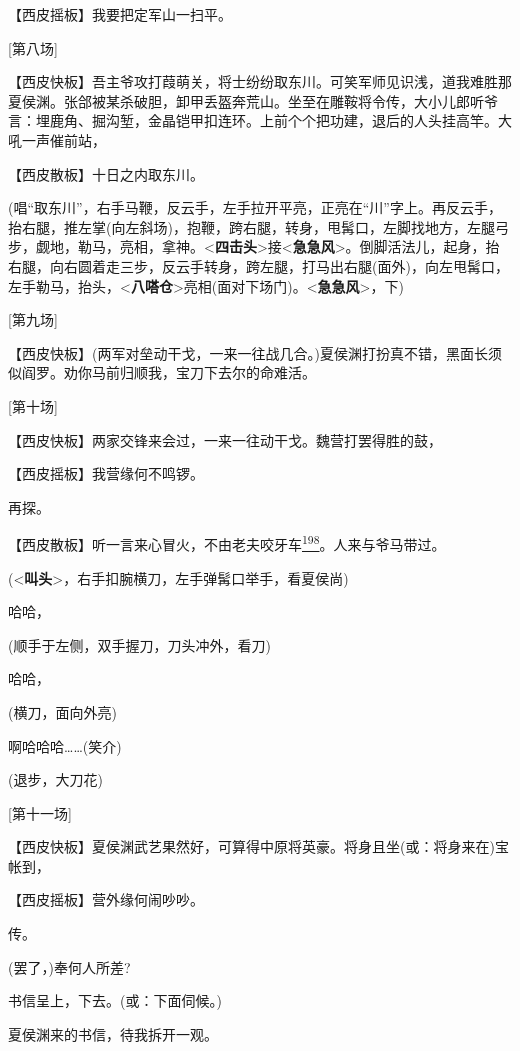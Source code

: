 【西皮摇板】我要把定军山一扫平。

{[}第八场{]}

【西皮快板】吾主爷攻打葭萌关，将士纷纷取东川。可笑军师见识浅，道我难胜那夏侯渊。张郃被某杀破胆，卸甲丢盔奔荒山。坐至在雕鞍将令传，大小儿郎听爷言：埋鹿角、掘沟堑，金晶铠甲扣连环。上前个个把功建，退后的人头挂高竿。大吼一声催前站，

【西皮散板】十日之内取东川。

(唱``取东川''，右手马鞭，反云手，左手拉开平亮，正亮在``川''字上。再反云手，抬右腿，推左掌(向左斜场)，抱鞭，跨右腿，转身，甩髯口，左脚找地方，左腿弓步，觑地，勒马，亮相，拿神。\textless{}\textbf{四击头}\textgreater{}接\textless{}\textbf{急急风}\textgreater{}。倒脚活法儿，起身，抬右腿，向右圆着走三步，反云手转身，跨左腿，打马出右腿(面外)，向左甩髯口，左手勒马，抬头，\textless{}\textbf{八嗒仓}\textgreater{}亮相(面对下场门)。\textless{}\textbf{急急风}\textgreater{}，下)

{[}第九场{]}

【西皮快板】(两军对垒动干戈，一来一往战几合。)夏侯渊打扮真不错，黑面长须似阎罗。劝你马前归顺我，宝刀下去尔的命难活。

{[}第十场{]}

【西皮快板】两家交锋来会过，一来一往动干戈。魏营打罢得胜的鼓，

【西皮摇板】我营缘何不鸣锣。

再探。

【西皮散板】听一言来心冒火，不由老夫咬牙车\protect\hyperlink{fn198}{\textsuperscript{198}}。人来与爷马带过。

(\textless{}\textbf{叫头}\textgreater{}，右手扣腕横刀，左手弹髯口举手，看夏侯尚)

哈哈，

(顺手于左侧，双手握刀，刀头冲外，看刀)

哈哈，

(横刀，面向外亮)

啊哈哈哈\ldots{}\ldots{}(笑介)

(退步，大刀花)

{[}第十一场{]}

【西皮快板】夏侯渊武艺果然好，可算得中原将英豪。将身且坐(或：将身来在)宝帐到，

【西皮摇板】营外缘何闹吵吵。

传。

(罢了，)奉何人所差?

书信呈上，下去。(或：下面伺候。)

夏侯渊来的书信，待我拆开一观。

